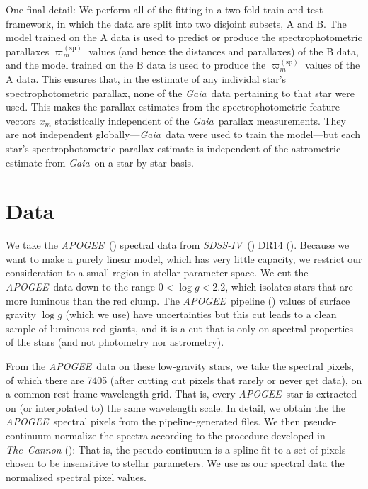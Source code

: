 \documentclass[modern]{aastex62}
\newcommand{\code}[1]{\texttt{\detokenize{#1}}}
\newcommand{\acronym}[1]{{\small{#1}}}
\newcommand{\project}[1]{\textsl{#1}}
\newcommand{\apogee}{\project{\acronym{APOGEE}}}
\newcommand{\gaia}{\project{Gaia}}
\newcommand{\sdssiv}{\project{\acronym{SDSS-IV}}}
\newcommand{\logg}{\log g}
\newcommand{\sparallax}{\varpi^{(\mathrm{sp})}}
\begin{document}
One final detail: We perform all of the fitting in a two-fold train-and-test framework,
in which the data are split into two disjoint subsets, A and B.
The model trained on the A data is used to predict or produce
the spectrophotometric parallaxes $\sparallax_m$ values (and hence
the distances and parallaxes) of the B data,
and the model trained on the B data is used to 
produce the $\sparallax_m$ values of the A data.
This ensures that, in the estimate of any individal star's
spectrophotometric parallax, none of the \gaia\ data pertaining to that star were used.
This makes the parallax estimates from the spectrophotometric feature vectors
$x_m$ statistically independent of the \gaia\ parallax measurements.
They are not independent globally---\gaia\ data were used to train the model---but
each star's spectrophotometric parallax estimate is independent
of the astrometric estimate from \gaia\ on a star-by-star basis.

\section{Data}

We take the \apogee\ (\citealt{aapogee, wapogee, apogee}) spectral data
from \sdssiv\ (\citealt{sdssiv}) \acronym{DR14} (\citealt{dr14}).
Because we want to make a purely linear model, which has very little capacity,
we restrict our consideration to a small region in stellar parameter space.
We cut the \apogee\ data down to the range $0<\logg<2.2$, which isolates
stars that are more luminous than the red clump.
The \apogee\ pipeline (\citealt{aspcap})
values of surface gravity $\logg$ (which we use) have uncertainties but
this cut leads to a clean sample of luminous red giants, and it is a cut
that is only on spectral properties of the stars (and not photometry nor astrometry).

From the \apogee\ data on these low-gravity stars, we take the spectral pixels,
of which there are 7405 (after cutting out pixels that rarely or never get data),
on a common rest-frame wavelength grid.
That is, every \apogee\ star is extracted on (or interpolated to)
the same wavelength scale.
In detail, we obtain the
the \apogee\ spectral pixels from the pipeline-generated \code{aspcapStar} files.
We then pseudo-continuum-normalize the spectra according to the procedure developed
in \project{The~Cannon} (\citealt{cannon}):
That is, the pseudo-continuum is a spline fit to a set
of pixels chosen to be insensitive to stellar parameters.
We use as our spectral data the normalized spectral pixel values.
\end{document}
